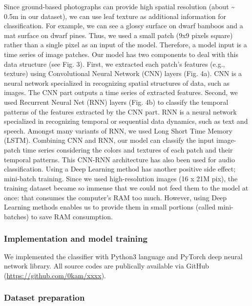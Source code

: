 \documentclass{article}
\begin{document}
Since ground-based photographs can provide high spatial resolution
(about \textasciitilde{} 0.5m in our dataset), we can use leaf texture
as additional information for classification. For example, we can see a
glossy surface on dwarf bamboos and a mat surface on dwarf pines. Thus,
we used a small patch (9x9 pixels square) rather than a single pixel as
an input of the model. Therefore, a model input is a time series of
image patches. Our model has two components to deal with this data
structure (see Fig. 3). First, we extracted each patch's features (e.g.,
texture) using Convolutional Neural Network (CNN) layers (Fig. 4a). CNN
is a neural network specialized in recognizing spatial structures of
data, such as images. The CNN part outputs a time series of extracted
features. Second, we used Recurrent Neural Net (RNN) layers (Fig. 4b) to
classify the temporal patterns of the features extracted by the CNN
part. RNN is a neural network specialized in recognizing temporal or
sequential data dynamics, such as text and speech. Amongst many variants
of RNN, we used Long Short Time Memory (LSTM). Combining CNN and RNN,
our model can classify the input image-patch time series considering the
colors and textures of each patch and their temporal patterns. This
CNN-RNN architecture has also been used for audio classification. Using
a Deep Learning method has another positive side effect; mini-batch
training. Since we used high-resolution images (16 x 21M pix), the
training dataset became so immense that we could not feed them to the
model at once: that consumes the computer's RAM too much. However, using
Deep Learning methods enables us to provide them in small portions
(called mini-batches) to save RAM consumption.

\hypertarget{implementation-and-model-training}{%
\subsubsection{Implementation and model
training}\label{implementation-and-model-training}}

We implemented the classifier with Python3 language and PyTorch deep
neural network library. All source codes are publically available via
GitHub (\url{https://github.com/0kam/xxxx}).

\hypertarget{dataset-preparation}{%
\subsubsection{Dataset preparation}\label{dataset-preparation}}
\end{document}
